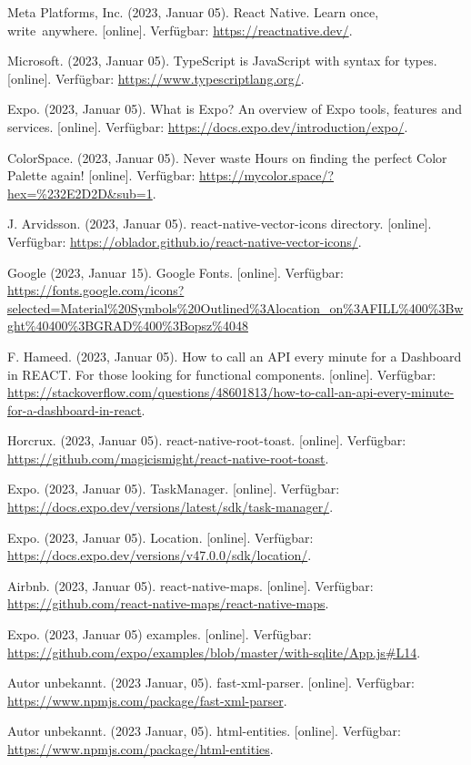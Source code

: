 \documentclass[12pt,oneside]{report}
\begin{document}
  \begin{thebibliography}{10}
  	 Meta Platforms, Inc. (2023, Januar 05). React Native. Learn once, write anywhere. [online]. Verfügbar: \url{https://reactnative.dev/}.
  	
  	 Microsoft. (2023, Januar 05). TypeScript is JavaScript with syntax for types. [online]. Verfügbar: \url{https://www.typescriptlang.org/}.
  	
  	 Expo. (2023, Januar 05). What is Expo? An overview of Expo tools, features and services. [online]. Verfügbar: \url{https://docs.expo.dev/introduction/expo/}.
  	
  	 ColorSpace. (2023, Januar 05). Never waste Hours on finding the perfect Color Palette again! [online]. Verfügbar: \url{https://mycolor.space/?hex=%232E2D2D&sub=1}.
  	
  	 J. Arvidsson. (2023, Januar 05). react-native-vector-icons directory. [online]. Verfügbar: \url{https://oblador.github.io/react-native-vector-icons/}.
  	
  	 Google (2023, Januar 15). Google Fonts. [online]. Verfügbar: \url{https://fonts.google.com/icons?selected=Material%20Symbols%20Outlined%3Alocation_on%3AFILL%400%3Bwght%40400%3BGRAD%400%3Bopsz%4048}
  	
	 F. Hameed. (2023, Januar 05). How to call an API every minute for a Dashboard in REACT. For those looking for functional components. [online]. Verfügbar: \url{https://stackoverflow.com/questions/48601813/how-to-call-an-api-every-minute-for-a-dashboard-in-react}.
	
	 Horcrux. (2023, Januar 05). react-native-root-toast. [online]. Verfügbar: \url{https://github.com/magicismight/react-native-root-toast}.
	
	 Expo. (2023, Januar 05). TaskManager. [online]. Verfügbar: \url{https://docs.expo.dev/versions/latest/sdk/task-manager/}.
	
	 Expo. (2023, Januar 05). Location. [online]. Verfügbar: \url{https://docs.expo.dev/versions/v47.0.0/sdk/location/}.
	
	 Airbnb. (2023, Januar 05). react-native-maps. [online]. Verfügbar: \url{https://github.com/react-native-maps/react-native-maps}.
	
	 Expo. (2023, Januar 05) examples. [online]. Verfügbar: \url{https://github.com/expo/examples/blob/master/with-sqlite/App.js#L14}.
	
	 Autor unbekannt. (2023 Januar, 05). fast-xml-parser. [online]. Verfügbar: \url{https://www.npmjs.com/package/fast-xml-parser}.
	
	 Autor unbekannt. (2023 Januar, 05). html-entities. [online]. Verfügbar: \url{https://www.npmjs.com/package/html-entities}.
  \end{thebibliography}
  \newpage
  
  \listoffigures
  \newpage
  \renewcommand{\lstlistlistingname}{Listingverzeichnis}
  \lstlistoflistings
  
\end{document}
